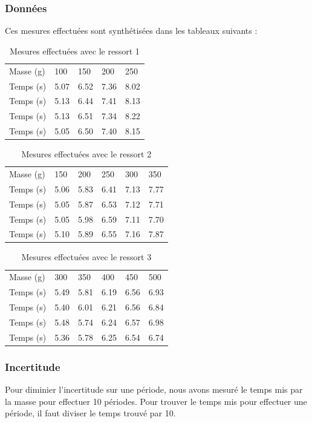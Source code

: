 \documentclass[a4paper,10pt,french]{scrartcl}
\begin{document}
\subsubsection{Données}
Ces mesures effectuées sont synthétisées dans les tableaux suivants :
\begin{table}[H]
\begin{center}
\begin{tabular}{lllll}
Masse (g) & 100 & 150 & 200 & 250\\
Temps (s) & 5.07 & 6.52 & 7.36 & 8.02\\
Temps (s) & 5.13 & 6.44 & 7.41 & 8.13\\
Temps (s) & 5.13 & 6.51 & 7.34 & 8.22\\
Temps (s) & 5.05 & 6.50 & 7.40 & 8.15
\end{tabular}
\end{center}
\caption{Mesures effectuées avec le ressort 1}
\end{table}
\begin{table}[H]
\begin{center}
\begin{tabular}{llllll}
Masse (g) & 150 & 200 & 250 & 300 & 350\\
Temps (s) & 5.06 & 5.83 & 6.41 & 7.13 & 7.77\\
Temps (s) & 5.05 & 5.87 & 6.53 & 7.12 & 7.71\\
Temps (s) & 5.05 & 5.98 & 6.59 & 7.11 & 7.70\\
Temps (s) & 5.10 & 5.89 & 6.55 & 7.16 & 7.87
\end{tabular}
\end{center}
\caption{Mesures effectuées avec le ressort 2}
\end{table}
\begin{table}[H]
\begin{center}
\begin{tabular}{llllll}
Masse (g) & 300 & 350 & 400 & 450 & 500\\
Temps (s) & 5.49 & 5.81 & 6.19 & 6.56 & 6.93\\
Temps (s) & 5.40 & 6.01 & 6.21 & 6.56 & 6.84\\
Temps (s) & 5.48 & 5.74 & 6.24 & 6.57 & 6.98\\
Temps (s) & 5.36 & 5.78 & 6.25 & 6.54 & 6.74
\end{tabular}
\caption{Mesures effectuées avec le ressort 3}
\end{center}
\end{table}
\subsubsection{Incertitude}
Pour diminier l'incertitude sur une période, nous avons mesuré le temps mis par la masse pour effectuer 10 périodes. Pour trouver le temps mis pour effectuer une période, il faut diviser le temps trouvé par 10.
\end{document}
